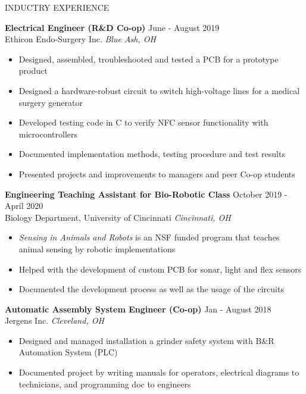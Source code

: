 \documentclass{../lib/resume} %
\begin{document}
	\begin{rSection}{INDUCTRY EXPERIENCE}
		
		\textbf{Electrical Engineer (R\&D Co-op)} \hfill June - August 2019\\
		Ethicon Endo-Surgery Inc. \hfill \textit{Blue Ash, OH}
		\begin{itemize}
			\itemsep -4pt {} 
			\item Designed, assembled, troubleshooted and tested a PCB for a prototype product
			\item Designed a hardware-robust circuit to switch high-voltage lines for a medical surgery generator
			\item Developed testing code in C to verify NFC sensor functionality with microcontrollers
			\item Documented implementation methods, testing procedure and test results
			\item Presented projects and improvements to managers and peer Co-op students
		\end{itemize}

		\textbf{Engineering Teaching Assistant for Bio-Robotic Class} \hfill October 2019 - April 2020\\
		Biology Department, University of Cincinnati \hfill \textit{Cincinnati, OH}
		\begin{itemize}
			\itemsep -4pt {} 
			\item \textit{Sensing in Animals and Robots} is an NSF funded program that teaches animal sensing by robotic implementations
			\item Helped with the development of custom PCB for sonar, light and flex sensors
			\item Documented the development process as well as the usage of the circuits
		\end{itemize}

		\textbf{Automatic Assembly System Engineer (Co-op)} \hfill Jan - August 2018
		\\	Jergens Inc. \hfill \textit{Cleveland, OH}
		\begin{itemize}
			\itemsep -4pt {} 
			\item Designed and managed installation a grinder safety system with B\&R Automation System (PLC)
			\item Documented project by writing manuals for operators, electrical diagrams to technicians, and programming doc to engineers
		\end{itemize}
		
		

	\end{rSection} 
	
\end{document}
